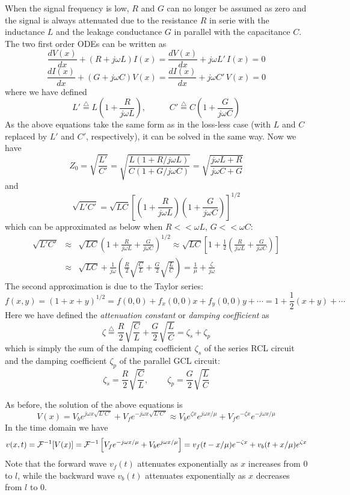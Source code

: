 When the signal frequency is low, $R$ and $G$ can no longer be assumed as 
zero and the signal is always attenuated due to the resistance $R$ in serie
 with the inductance $L$ and the leakage conductance $G$ in parallel with the
capacitance $C$. The two first order ODEs can be written as
\[ \frac{dV(x)}{dx}+(R+j\omega L)I(x)=\frac{dV(x)}{dx}+j\omega L'\,I(x)=0 \]
\[ \frac{dI(x)}{dx}+(G+j\omega C)V(x)=\frac{dI(x)}{dx}+j\omega C'\,V(x)=0 \]
where we have defined
\[	L'\stackrel{\triangle}{=}L\left(1+\frac{R}{j\omega L}\right),
\;\;\;\;\;\;\;\;\;\;
	C'\stackrel{\triangle}{=}C\left(1+\frac{G}{j\omega C}\right)	\]
As the above equations take the same form as in the loss-less case (with $L$ 
and $C$ replaced by $L'$ and $C'$, respectively), it can be solved in the 
same way. Now we have
\[ Z_0=\sqrt{\frac{L'}{C'}}=\sqrt{\frac{L(1+R/j\omega L)}{C(1+G/j\omega C)}}
=\sqrt{\frac{j\omega L+R}{j\omega C+G}} \]
and
\[ \sqrt{L'C'}=\sqrt{LC}\left[ \left(1+\frac{R}{j\omega L}\right)
\left(1+\frac{G}{j\omega C}\right) \right]^{1/2} \]
which can be approximated as below when $R<<\omega L$, $G<<\omega C$:
\begin{eqnarray}
  \sqrt{L'C'}&\approx&\sqrt{LC}\left(1+\frac{R}{j\omega L}+\frac{G}{j\omega C}\right)^{1/2}
  \approx \sqrt{LC}\left[1+\frac{1}{2}\left(\frac{R}{j\omega L}+\frac{G}{j\omega C}\right)\right]
  \nonumber \\
  &\approx&\sqrt{LC}+\frac{1}{j\omega}\left( \frac{R}{2}\sqrt{\frac{C}{L}}+\frac{G}{2}\sqrt{\frac{L}{C}} \right)=\frac{1}{\mu}+\frac{\zeta }{j\omega}
  \nonumber 
\end{eqnarray}
The second approximation is due to the Taylor series:
\[ f(x,y)=(1+x+y)^{1/2}=f(0,0)+f_x(0,0)x+f_y(0,0)y+\cdots
=1+\frac{1}{2}(x+y)+\cdots \]
Here we have defined the {\em attenuation constant} or {\em damping coefficient} 
as
\[ \zeta\stackrel{\triangle}{=}\frac{R}{2}\sqrt{\frac{C}{L}}+
\frac{G}{2}\sqrt{\frac{L}{C}}=\zeta_s+\zeta_p
\]
which is simply the sum of the damping coefficient $\zeta_s$ of the
series RCL circuit and the damping coefficient $\zeta_p$ of the parallel
GCL circuit:
\[ \zeta_s=\frac{R}{2}\sqrt{\frac{C}{L}},\;\;\;\;\;\;\;\;
\zeta_p=\frac{G}{2}\sqrt{\frac{L}{C}} \]

As before, the solution of the above equations is
\[	V(x)=V_be^{j\omega x\sqrt{L'C'}}+V_fe^{-j\omega x\sqrt{L'C'}}
\approx V_be^{\zeta x}e^{j\omega x/\mu}+V_fe^{-\zeta x}e^{-j\omega x/\mu}
\]
In the time domain we have
\[  v(x,t)={\cal F}^{-1}[V(x)]={\cal F}^{-1}\left[V_f e^{-j\omega x/\mu}+V_b e^{j\omega x/\mu}\right]
=v_f(t-x/\mu)e^{-\zeta x}+v_b(t+x/\mu) e^{\zeta x}
\]
Note that the forward wave $v_f(t)$ attenuates exponentially as $x$ increases
from 0 to $l$, while the backward wave $v_b(t)$ attenuates exponentially as $x$ 
decreases from $l$ to 0.


